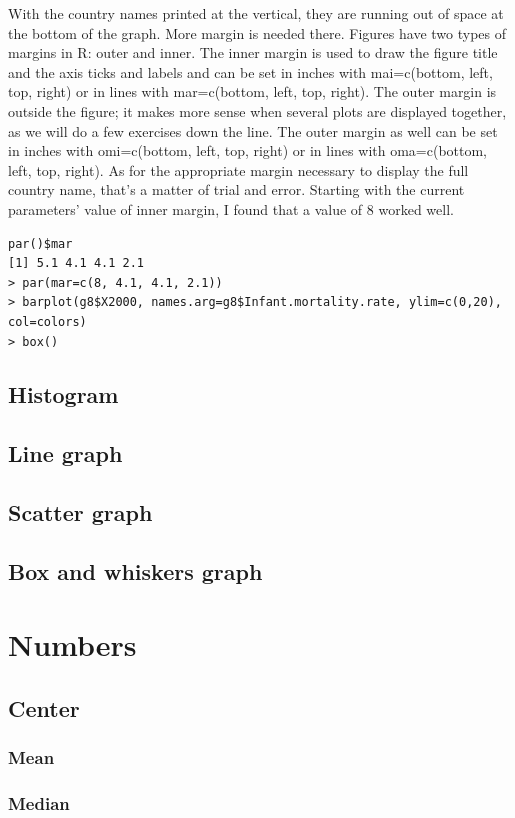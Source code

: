 \documentclass{report}
\newcommand{\code}[1]{\textsf{\ttfamily #1}}
\begin{document}
With the country names printed at the vertical, they are running out of space at the bottom of the graph. More margin is needed there. Figures have two types of margins in R: outer and inner. The inner margin is used to draw the figure title and the axis ticks and labels and can be set in inches with \code{mai=c(bottom, left, top, right)} or in lines with \code{mar=c(bottom, left, top, right)}. The outer margin is outside the figure; it makes more sense when several plots are displayed together, as we will do a few exercises down the line. The outer margin as well can be set in inches with \code{omi=c(bottom, left, top, right)} or in lines with \code{oma=c(bottom, left, top, right)}. As for the appropriate margin necessary to display the full country name, that's a matter of trial and error. Starting with the current parameters' value of inner margin, I found that a value of 8 worked well.
\begin{verbatim}
par()$mar
[1] 5.1 4.1 4.1 2.1
> par(mar=c(8, 4.1, 4.1, 2.1))
> barplot(g8$X2000, names.arg=g8$Infant.mortality.rate, ylim=c(0,20), col=colors)
> box()
\end{verbatim}


	\subsection{Histogram}
	\subsection{Line graph}
	\subsection{Scatter graph}
	\subsection{Box and whiskers graph}
	\section{Numbers}
	\subsection{Center}
	\subsubsection{Mean}
	\subsubsection{Median}
\end{document}
